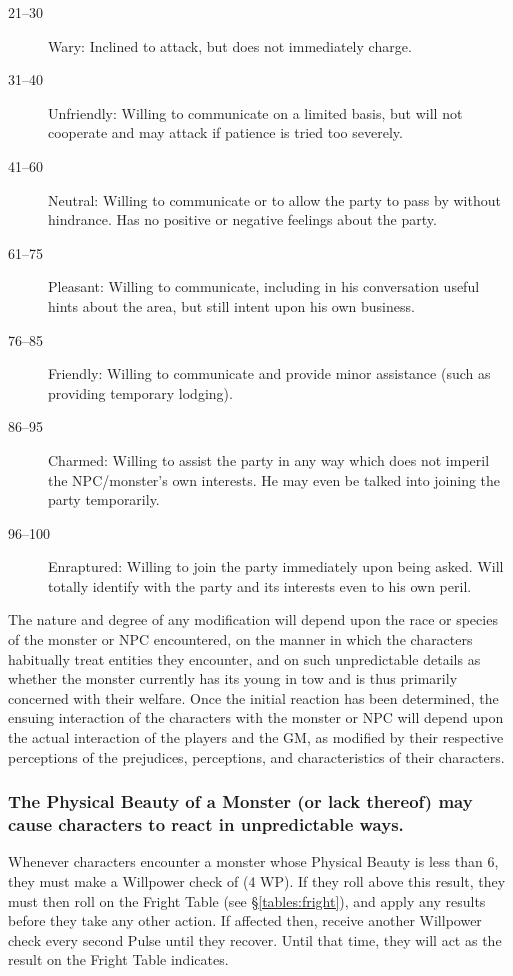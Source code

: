 \begin{multicols}{3}
\begin{description}
\item[21--30]
Wary: Inclined to attack, but does not immediately charge.

\item[31--40]
Unfriendly: Willing to communicate on a limited basis, but will not
cooperate and may attack if patience is tried too severely.

\item[41--60] Neutral: Willing to communicate or to allow the party to
pass by without hindrance.  Has no positive or negative feelings
about the party.

\item[61--75] Pleasant: Willing to communicate, including in his
conversation useful hints about the area, but still intent upon his
own business.

\item[76--85] Friendly: Willing to communicate and provide minor
assistance (such as providing temporary lodging).

\item[86--95] Charmed: Willing to assist the party in any way which
does not imperil the NPC/monster's own interests.  He may even be
talked into joining the party temporarily.

\item[96--100] Enraptured: Willing to join the party immediately upon
being asked.  Will totally identify with the party and its
interests even to his own peril.
\end{description}

The nature and degree of any modification will depend upon the race or
species of the monster or NPC encountered, on the manner in which the
characters habitually treat entities they encounter, and on such
unpredictable details as whether the monster currently has its young
in tow and is thus primarily concerned with their welfare. Once the
initial reaction has been determined, the ensuing interaction of the
characters with the monster or NPC will depend upon the actual
interaction of the players and the GM, as modified by their respective
perceptions of the prejudices, perceptions, and characteristics of
their characters.

\subsubsection{The Physical Beauty of a Monster (or lack thereof) may
cause characters to react in unpredictable ways.}

Whenever characters encounter a monster whose Physical Beauty is less
than 6, they must make a Willpower check of (4 \x WP). If they roll
above this result, they must then roll on the Fright Table (see
\S\ref{tables:fright}), and apply any results before they take any
other action.  If affected then, receive another Willpower check every
second Pulse until they recover. Until that time, they will act as the
result on the Fright Table indicates.


\end{multicols}
